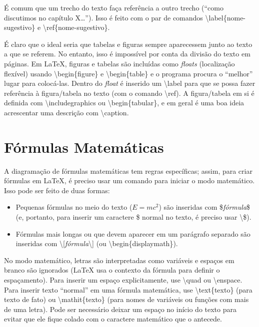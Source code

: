 É comum que um trecho do texto faça referência a outro trecho (``como discutimos
no capítulo X\ldots''). Isso é feito com o par de comandos
\textsf{\textbackslash{}label\{nome-sugestivo\}} e
\textsf{\textbackslash{}ref\{nome-sugestivo\}}.

É claro que o ideal seria que tabelas e figuras sempre aparecessem junto ao
texto a que se referem. No entanto, isso é impossível por conta da divisão
do texto em páginas. Em \LaTeX{}, figuras e tabelas são incluídas como
\emph{floats} (localização flexível) usando \textsf{\textbackslash{}begin\{figure\}}
e \textsf{\textbackslash{}begin\{table\}} e o programa procura o ``melhor''
lugar para colocá-las. Dentro do \emph{float} é inserido um
\textsf{\textbackslash{}label} para que se possa fazer referência à figura/tabela
no texto (com o comando \textsf{\textbackslash{}ref}). A figura/tabela em
si é definida com \textsf{\textbackslash{}includegraphics} ou
\textsf{\textbackslash{}begin\{tabular\}}, e em geral é uma boa ideia acrescentar
uma descrição com \textsf{\textbackslash{}caption}.

\section{Fórmulas Matemáticas}

A diagramação de fórmulas matemáticas tem regras específicas; assim, para
criar fórmulas em \LaTeX{}, é preciso usar um comando para iniciar o modo
matemático. Isso pode ser feito de duas formas:

\begin{itemize}
  \item Pequenas fórmulas no meio do texto ($E=mc^2$) são inseridas com
  \textsf{\$\textit{fórmula}\$} (e, portanto, para inserir um caractere \$
  normal no texto, é preciso usar \textsf{\textbackslash{}\$}).

  \item Fórmulas mais longas ou que devem aparecer em um parágrafo
  separado são inseridas com
  \textsf{\textbackslash{}[\textit{fórmula}\textbackslash{}]} (ou
  \textsf{\textbackslash{}begin\{displaymath\}}).
\end{itemize}

No modo matemático, letras são interpretadas como variáveis e espaços
em branco são ignorados (\LaTeX{} usa o contexto da fórmula para
definir o espaçamento). Para inserir um espaço explicitamente, use
\textsf{\textbackslash{}quad} ou \textsf{\textbackslash{}enspace}.
Para inserir texto ``normal'' em uma fórmula matemática, use
\textsf{\textbackslash{}text\{texto\}} (para texto de fato) ou
\textsf{\textbackslash{}mathit\{texto\}} (para nomes de variáveis
ou funções com mais de uma letra). Pode ser necessário deixar um
espaço no início do texto para evitar que ele fique colado com o
caractere matemático que o antecede.

